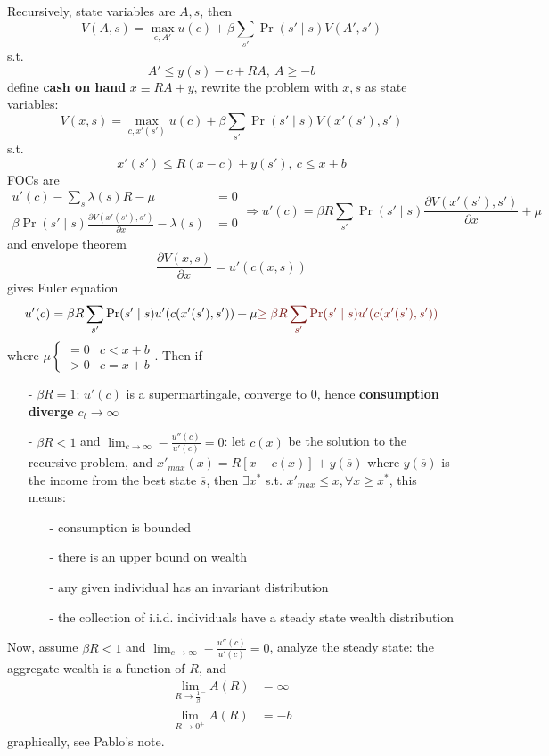 \documentclass[10pt,landscape,a4paper]{article}
\let\bar\overline
\begin{document}
\begin{multicols*}{3}
Recursively, state variables are $A,s$, then
$$
V(A,s) = \max_{c,A'} u(c) + \beta\sum_{s'}\Pr(s'\mid s)V(A',s')
$$
s.t.
$$A'\leq y(s)-c+RA,\ A\geq -b$$
define \textbf{cash on hand} $x\equiv RA+y$, rewrite the problem with $x,s$ as state variables:
$$
V(x,s) = \max_{c,x'(s')} u(c) + \beta\sum_{s'}\Pr(s'\mid s)V(x'(s'),s')
$$
s.t.
$$x'(s')\leq R(x-c)+y(s'),\ c\leq x+b$$
FOCs are
$$
\begin{aligned}
u'(c)-\sum_{s}\lambda(s)R-\mu &= 0 \\
\beta \Pr(s'\mid s)\frac{\partial V(x'(s'),s')}{\partial x} - \lambda(s) &= 0
\end{aligned} \Rightarrow u'(c) = \beta R\sum_{s'} \Pr(s'\mid s)\frac{\partial V(x'(s'),s')}{\partial x} + \mu
$$
and envelope theorem
$$
\frac{\partial V(x,s)}{\partial x} = u'(c(x,s))
$$
gives Euler equation
$$
u'(c) = \beta R\sum_{s'}\Pr(s'\mid s)u'(c(x'(s'),s'))+\mu {\color{myred}\geq \beta R\sum_{s'}\Pr(s'\mid s)u'(c(x'(s'),s'))}
$$
where $\mu \begin{cases}
=0 & c<x+b\\
>0 & c=x+b
\end{cases}$.
Then if
\begin{itemize}
    \item[-] $\beta R=1$: $u'(c)$ is a supermartingale, converge to 0, hence \textbf{consumption {\color{myred}diverge}} $c_t\rightarrow \infty$ 
    \item[-] $\beta R<1$ and $\lim_{c\rightarrow\infty}-\frac{u''(c)}{u'(c)}=0$: let $c(x)$ be the solution to the recursive problem, and $x'_{max}(x) = R[x-c(x)]+y(\bar{s})$ where $y(\bar{s})$ is the income from the best state $\bar{s}$, then $\exists x^*$ s.t. $x'_{max}\leq x,\forall x\geq x^*$, this means:
    \begin{itemize}
        \item[-] consumption is bounded
        \item[-] there is an upper bound on wealth
        \item[-] any given individual has an invariant distribution
        \item[-] the collection of i.i.d. individuals have a steady state wealth distribution
    \end{itemize}
\end{itemize}

Now, assume $\beta R<1$ and $\lim_{c\rightarrow\infty}-\frac{u''(c)}{u'(c)}=0$, analyze the steady state: the aggregate wealth is a function of $R$, and 
\begin{align*}
    \lim_{R\rightarrow\frac{1}{\beta}^-}A(R) &=\infty  \\
    \lim_{R\rightarrow 0^+}A(R) &= -b
\end{align*}
graphically, see Pablo's note.


\end{multicols*}
\end{document}
